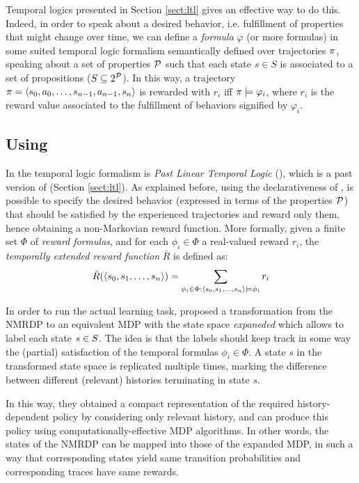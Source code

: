 Temporal logics presented in Section \ref{sect:ltl} gives an effective way to do this. 
Indeed, in order to speak about a desired behavior,  i.e. fulfillment of properties that might change over time, we can define a \emph{formula} $\varphi$ (or more formulas) in some suited temporal logic formalism semantically defined over trajectories $\pi$, speaking about a set of properties $\mathcal{P}$ such that each state $s\in S$ is associated to a set of propositions ($S\subseteq 2^{\mathcal{P}}$). 
In this way, a trajectory $\pi = \langle s_0, a_0, \dots, s_{n-1}, a_{n-1}, s_n \rangle$ is rewarded with $r_i$ iff $\pi \models \varphi_i$, where $r_i$ is the reward value associated to the fulfillment of behaviors signified by $\varphi_i$.

\subsection{Using \PLTL}
\label{sect:using-pltl}
In \citep{bacchus1996rewarding} the temporal logic formalism is \emph{Past Linear Temporal Logic} (\PLTL), which is a past version of \LTL (Section \ref{sect:ltl}).
As explained before, using the declarativeness of \PLTL, is possible to specify the desired behavior (expressed in terms of the properties $\mathcal{P}$) that should be satisfied by the experienced trajectories and reward only them, hence obtaining a non-Markovian reward function. More formally, given a finite set $\Phi$ of \PLTL \emph{reward formulas}, and for each $\phi_i \in \Phi$ a real-valued reward $r_i$, the \emph{temporally extended reward function} $\bar{R}$ is defined as:
\begin{equation}\label{pltl-temp-extended-reward-fun}
\bar{R}(\langle s_0, s_1, \dots, s_n \rangle) = \sum_{\phi_i \in \Phi : \langle s_0, s_1, \dots, s_n \rangle\models \phi_i} r_i
\end{equation}


In order to run the actual learning task, \citep{bacchus1996rewarding} proposed a transformation from the NMRDP to an equivalent MDP with the state space \emph{expaneded} which allows to label each state $s\in S$. The idea is that the labels should 
keep track in some way the (partial) satisfaction of the temporal formulas $\phi_i \in \Phi$. 
A state $s$ in the transformed state space is replicated multiple times, marking the difference between different (relevant) histories terminating in state $s$.

In this way, they obtained a compact representation of the required history-dependent policy
by considering only relevant history, and can produce this
policy using computationally-effective MDP algorithms.
In other words, the states of the NMRDP can be mapped into those of the expanded MDP, 
in such a way that corresponding states yield
same transition probabilities and corresponding traces have same rewards.


